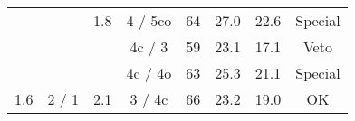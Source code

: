 \begin{tabular}{|c|c|c|c|c|c|c|c|}
 					  & 						& \multirow{-3}{*}{1.8} & {\color[HTML]{3166FF}4 / 5co} & {\color[HTML]{3166FF}64} & {\color[HTML]{3166FF}27.0} & {\color[HTML]{3166FF}22.6} & {\color[HTML]{3166FF}Special} \\
\cline{3-8} 
 					  & 					  & 						& {\color[HTML]{009901}4c / 3} & {\color[HTML]{009901}59} & {\color[HTML]{009901}23.1} & {\color[HTML]{009901}17.1} & {\color[HTML]{009901}Veto} \\
 					  & 					  & 					  & {\color[HTML]{3166FF}4c / 4o} & {\color[HTML]{3166FF}63} & {\color[HTML]{3166FF}25.3} & {\color[HTML]{3166FF}21.1} & {\color[HTML]{3166FF}Special} \\
\multirow{-15}{*}{1.6} & \multirow{-15}{*}{2 / 1} & \multirow{-3}{*}{2.1} & 3 / 4c & 66 & 23.2 & 19.0 & OK \\

\hline


\end{tabular}
